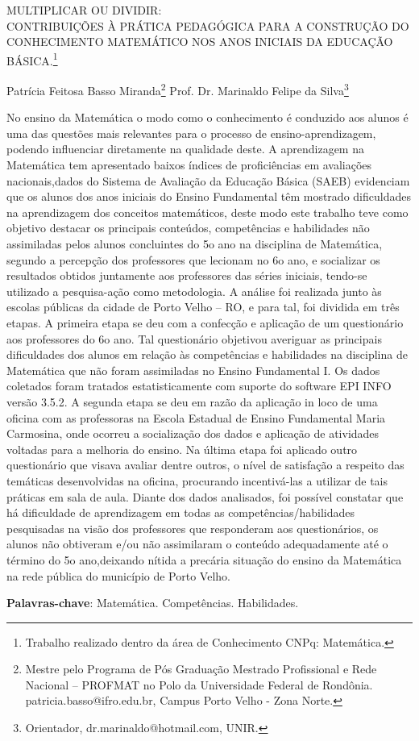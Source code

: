 \documentclass[article,12pt,onesidea,4paper,english,brazil]{abntex2}
\begin{document}
	
	
	\frenchspacing 
	
	\begin{center}
		\LARGE MULTIPLICAR OU DIVIDIR: \\CONTRIBUIÇÕES À PRÁTICA PEDAGÓGICA PARA A CONSTRUÇÃO DO CONHECIMENTO MATEMÁTICO NOS ANOS INICIAIS DA EDUCAÇÃO BÁSICA.\footnote{Trabalho realizado dentro da área de Conhecimento CNPq: Matemática.}
		
		\normalsize
		Patrícia Feitosa Basso Miranda\footnote{Mestre pelo Programa de Pós Graduação Mestrado Profissional e Rede Nacional – PROFMAT no Polo da Universidade Federal de Rondônia. patricia.basso@ifro.edu.br, Campus Porto Velho - Zona Norte.} 
		Prof. Dr. Marinaldo Felipe da Silva\footnote{Orientador, dr.marinaldo@hotmail.com, UNIR.} 
	\end{center}
	
	\noindent No ensino da Matemática o modo como o conhecimento é conduzido aos alunos é
	uma das questões mais relevantes para o processo de ensino-aprendizagem,
	podendo influenciar diretamente na qualidade deste. A aprendizagem na Matemática
	tem apresentado baixos índices de proficiências em avaliações nacionais,dados do
	Sistema de Avaliação da Educação Básica (SAEB) evidenciam que os alunos dos
	anos iniciais do Ensino Fundamental têm mostrado dificuldades na aprendizagem
	dos conceitos matemáticos, deste modo este trabalho teve como objetivo destacar
	os principais conteúdos, competências e habilidades não assimiladas pelos alunos
	concluintes do 5o ano na disciplina de Matemática, segundo a percepção dos
	professores que lecionam no 6o ano, e socializar os resultados obtidos juntamente
	aos professores das séries iniciais, tendo-se utilizado a pesquisa-ação como
	metodologia. A análise foi realizada junto às escolas públicas da cidade de Porto
	Velho – RO, e para tal, foi dividida em três etapas. A primeira etapa se deu com a
	confecção e aplicação de um questionário aos professores do 6o ano. Tal
	questionário objetivou averiguar as principais dificuldades dos alunos em relação às
	competências e habilidades na disciplina de Matemática que não foram assimiladas
	no Ensino Fundamental I. Os dados coletados foram tratados estatisticamente com
	suporte do software EPI INFO versão 3.5.2. A segunda etapa se deu em razão da
	aplicação in loco de uma oficina com as professoras na Escola Estadual de Ensino
	Fundamental Maria Carmosina, onde ocorreu a socialização dos dados e aplicação
	de atividades voltadas para a melhoria do ensino. Na última etapa foi aplicado outro
	questionário que visava avaliar dentre outros, o nível de satisfação a respeito das
	temáticas desenvolvidas na oficina, procurando incentivá-las a utilizar de tais
	práticas em sala de aula. Diante dos dados analisados, foi possível constatar que há
	dificuldade de aprendizagem em todas as competências/habilidades pesquisadas na
	visão dos professores que responderam aos questionários, os alunos não obtiveram
	e/ou não assimilaram o conteúdo adequadamente até o término do 5o ano,deixando
	nítida a precária situação do ensino da Matemática na rede pública do município de
	Porto Velho.
	
	\vspace{\onelineskip}
	
	\noindent
	\textbf{Palavras-chave}: Matemática. Competências. Habilidades.
	
\end{document}
